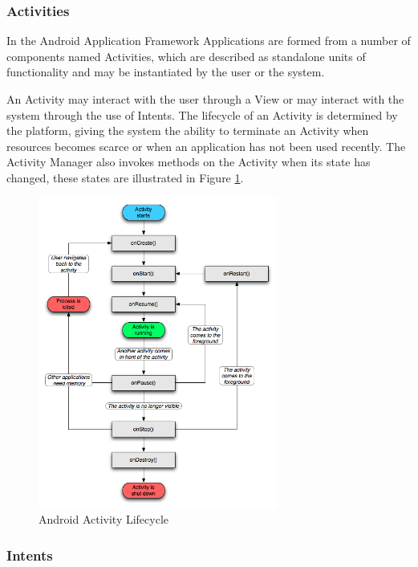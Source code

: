 \subsubsection{Activities}

In the Android Application Framework Applications are formed from a number of components named Activities, which are described as standalone units of functionality and may be instantiated by the user or the system. 

An Activity may interact with the user through a View or may interact with the system through the use of Intents. The lifecycle of an Activity is determined by the platform, giving the system the ability to terminate an Activity when resources becomes scarce or when an application has not been used recently. The Activity Manager also invokes methods on the Activity when its state has changed, these states are illustrated in Figure \ref{activity_lifecycle}. 

\begin{figure}[h!]
\centering
    \includegraphics[width=0.7\textwidth]{research/images/activity_lifecycle.png}
    \caption{Android Activity Lifecycle}%
    \label{activity_lifecycle}
\end{figure}

\subsubsection{Intents}

